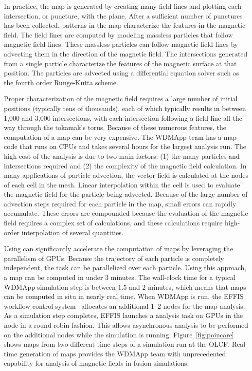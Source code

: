 In practice, the \poincare map is generated by creating many field lines and plotting each intersection, or puncture, with the plane.
After a sufficient number of punctures has been collected, patterns in the map characterize the features in the magnetic field.
The field lines are computed by modeling massless particles that follow magnetic field lines.
These massless particles can follow magnetic field lines by advecting them in the direction of the magnetic field.
The intersections generated from a single particle characterize the features of the magnetic surface at that position.
The particles are advected using a differential equation solver such as the fourth order Runge-Kutta scheme.

Proper characterization of the magnetic field requires a large number of initial positions (typically tens of thousands), each of which typically results in between 1,000 and 3,000 intersections, with each intersection following a field line all the way through the tokamak's torus.
Because of these numerous features, the computation of a \poincare map can be very expensive.
The WDMApp team has a \poincare map code that runs on CPUs and takes several hours for the largest analysis run. 
The high cost of the analysis is due to two main factors: (1) the many particles and intersections required and (2) the complexity of the magnetic field calculation.  In many applications of particle advection, the vector field is calculated at the nodes of each cell in the mesh. Linear interpolation within the cell is used to evaluate the magnetic field for the particle being advected. Because of the large number of advection steps required for each particle in the \poincare map, small errors can rapidly accumulate. These errors are compounded because the evaluation of the magnetic field requires a complex set of calculations, and these calculations require high-order interpolation of several quantities.

Using \vtkm can significantly accelerate the computation of \poincare maps by leveraging the parallelism of GPUs. Because the trajectory of each particle is completely independent, the task can be parallelized over each particle. Using this approach, a \poincare map can be computed in under $3$ minutes. The wall-clock time for a typical WDMApp simulation step is between $1.5$ and $2$ minutes, which means that \poincare maps can be computed in situ in nearly real time.
When WDMApp is run, the EFFIS workflow control system~\citep{Suchyta2022:effis} allocates an additional 1--2 nodes for the \poincare map analysis. As a simulation step completes, EFFIS launches a \poincare analysis task on GPUs in the node in a round-robin fashion. This allows asynchronous analysis to be performed on the additional nodes while the simulation is running. Figure~\ref{fig:poincare} shows \poincare maps from two different time steps of a simulation run at the OLCF.
Real-time generation of \poincare maps provides the WDMApp team with unprecedented capability for analysis of magnetic fields in fusion simulations.


